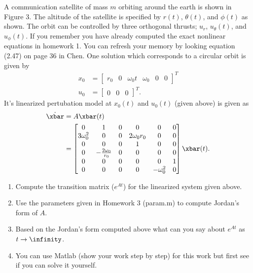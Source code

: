 \documentclass[10pt]{article}
\renewcommand{\matlab}{{\sc Matlab }}
\begin{document}
\section{}
A communication satellite of mass $m$ orbiting around the earth is shown
in Figure 3. The altitude of the satellite is specified by $r(t)$,
$\theta(t)$, and $\phi(t)$ as shown. The orbit can be controlled by
three orthogonal thrusts; $u_r$, $u_\theta(t)$, and $u_\phi(t)$. If
you remember you have already computed the exact nonlinear equations
in homework 1. You can refresh your memory by looking equation (2.47)
on page 36 in Chen. One solution which corresponds to a circular orbit
is given by 
\begin{equation}
  \begin{split}
    x_0 &=
    \begin{bmatrix}
      r_0 & 0 & \omega_0t & \omega_0 & 0 & 0
    \end{bmatrix}^T\\
    u_0 &=
    \begin{bmatrix}
      0 & 0 & 0
    \end{bmatrix}^T.
  \end{split}
\end{equation}
It's linearized pertubation model at $x_0(t)$ and $u_0(t)$ (given
above) is given as
\begin{equation}
\begin{split}
  \dot{\xbar} &= A\xbar(t)\\
  &=
  \begin{bmatrix}
   0&1&0&0&0&0\\ 
   3\omega_0^2 &0&0&2\omega_0r_0 &0&0\\ 
   0&0&0&1&0&0\\ 
   0&-\frac{2\omega_0}{r_0} &0&0&0&0\\ 
   0&0&0&0&0&1\\ 
   0&0&0&0&-\omega_0^2 &0\\ 
  \end{bmatrix}\xbar(t).
\end{split}
\end{equation}

\begin{enumerate}[label=(\alph*)]
\item Compute the transition matrix ($e^{At}$) for the linearized
  system given above.
\item Use the parameters given in Homework 3 (param.m) to compute
  Jordan's form of $A$.
\item Based on the Jordan's form computed above what can you say about
  $e^{At}$ as $t \rightarrow \infinity$.
\item You can use \matlab (show your work step by step) for this work
  but first see if you can solve it yourself.
\end{enumerate}
\end{document}

